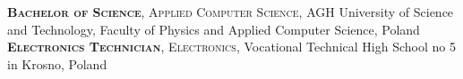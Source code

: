 

\begin{education}
					{\textbf{\textsc{Bachelor of Science}}, \textsc{Applied Computer Science}, AGH University of Science and Technology,\hspace{8em} Faculty of Physics and Applied Computer Science, Poland}
					{\textbf{\textsc{Electronics Technician}}, \textsc{Electronics}, Vocational Technical High School no 5 in Krosno, Poland}
\end{education}